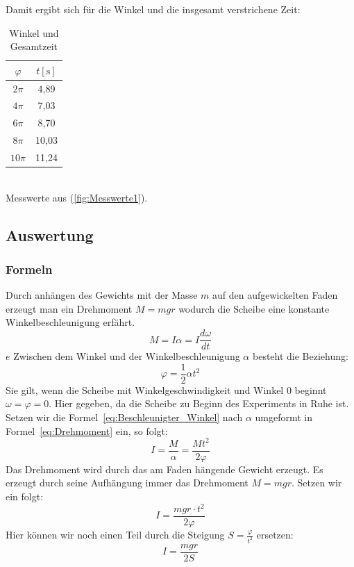 \documentclass{article}
\begin{document}
				Damit ergibt sich für die Winkel und die insgesamt verstrichene Zeit:
				\begin{table}[!h]
					\centering
					\begin{tabular}{ | c | c | } 
						\hline
						\( \varphi \) & \(t [\unit{\second}]\) \\
						\hline
						\( 2\pi \) & 4,89 \\
						\( 4\pi \) & 7,03 \\
						\( 6\pi \) & 8,70 \\
						\( 8\pi \) & 10,03 \\
						\( 10\pi \) & 11,24 \\
						\hline
					\end{tabular}
					\caption{\label{tab:Winkel_Gesamtzeit}Winkel und Gesamtzeit}
				\end{table} \\
				Messwerte aus (\ref{fig:Messwerte1}).

		\subsection{Auswertung}
			\subsubsection{Formeln}
			Durch anhängen des Gewichts mit der Masse \(m\) auf den aufgewickelten Faden erzeugt man ein Drehmoment \(M = mgr\) wodurch die Scheibe eine konstante Winkelbeschleunigung erfährt.
			\begin{equation} \label{eq:Drehmoment}
				M = I \alpha = I \frac{d\omega}{dt}
			\end{equation} \(e\)
			Zwischen dem Winkel und der Winkelbeschleunigung \( \alpha \) besteht die Beziehung:
			\begin{equation} \label{eq:Beschleunigter_Winkel}
				\varphi = \frac{1}{2} \alpha t^2
			\end{equation}
			Sie gilt, wenn die Scheibe mit Winkelgeschwindigkeit und Winkel 0 beginnt \(\omega = \varphi = 0\).
			Hier gegeben, da die Scheibe zu Beginn des Experiments in Ruhe ist.
			Setzen wir die Formel~\ref{eq:Beschleunigter_Winkel} nach \( \alpha \) umgeformt in Formel~\ref{eq:Drehmoment} ein, so folgt:
			\begin{equation}
				I = \frac{M}{\alpha} = \frac{ Mt^2 }{2 \varphi}
			\end{equation}
			Das Drehmoment wird durch das am Faden hängende Gewicht erzeugt. Es erzeugt durch seine Aufhängung immer das Drehmoment \( M = mgr \). Setzen wir ein folgt:
			\begin{equation}
				I = \frac{ m g r \cdot t^2 }{ 2 \varphi }
			\end{equation}
			Hier können wir noch einen Teil durch die Steigung \(S = \frac{ \varphi }{ t^2 } \) ersetzen:
			\begin{equation}\label{eq:Trägheitsmoment_komplett}
				I = \frac{mgr}{2S}
			\end{equation}
\end{document}
